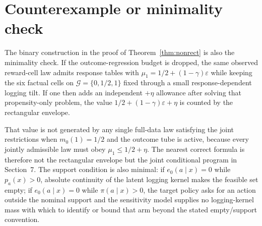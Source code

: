 \documentclass[11pt]{article}
\theoremstyle{definition}
\theoremstyle{plain}
\theoremstyle{remark}
\begin{document}
\section{Counterexample or minimality check}
The binary construction in the proof of Theorem~\ref{thm:nonrect} is also the
minimality check.  If the outcome-regression budget is dropped, the same
observed reward-cell law admits response tables with
$\mu_1=1/2+(1-\gamma)\varepsilon$ while keeping the six factual cells on
$\mathcal G=\{0,1/2,1\}$ fixed through a small response-dependent logging
tilt.  If one then adds an independent
$+\eta$ allowance after solving that propensity-only problem, the value
$1/2+(1-\gamma)\varepsilon+\eta$ is counted by the rectangular envelope.

That value is not generated by any single full-data law satisfying the joint
restrictions when $m_0(1)=1/2$ and the outcome tube is active, because every
jointly admissible law must obey $\mu_1\le1/2+\eta$.  The nearest correct
formula is therefore not the rectangular envelope but the joint conditional
program in Section~7.  The support condition is also minimal: if
$e_0(a\mid x)=0$ while $p_a(x)>0$, absolute continuity of the latent logging
kernel makes the feasible set empty; if $e_0(a\mid x)=0$ while
$\pi(a\mid x)>0$, the target policy asks for an action outside the nominal
support and the sensitivity model supplies no logging-kernel mass with which to
identify or bound that arm beyond the stated empty/support convention.
\end{document}
